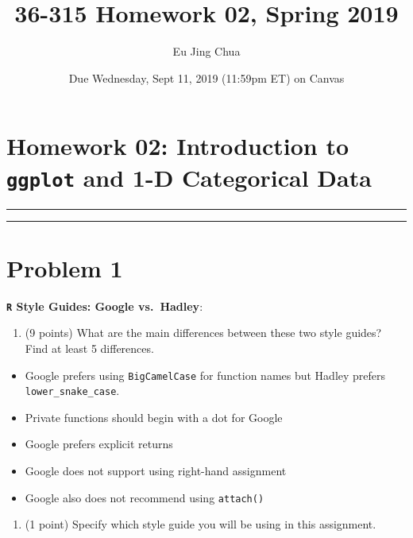 \documentclass[]{article}
\title{36-315 Homework 02, Spring 2019}
\author{Eu Jing Chua}
\date{Due Wednesday, Sept 11, 2019 (11:59pm ET) on Canvas}
\providecommand{\tightlist}{%
  \setlength{\itemsep}{0pt}\setlength{\parskip}{0pt}}
\begin{document}
\maketitle

\hypertarget{homework-02-introduction-to-ggplot-and-1-d-categorical-data}{%
\section{\texorpdfstring{Homework 02: Introduction to \texttt{ggplot}
and 1-D Categorical
Data}{Homework 02: Introduction to ggplot and 1-D Categorical Data}}\label{homework-02-introduction-to-ggplot-and-1-d-categorical-data}}

\begin{center}\rule{0.5\linewidth}{\linethickness}\end{center}

\begin{center}\rule{0.5\linewidth}{\linethickness}\end{center}

\hypertarget{problem-1}{%
\section{Problem 1}\label{problem-1}}

\textbf{\texttt{R} Style Guides: Google vs.~Hadley}:

\begin{enumerate}
\def\labelenumi{\alph{enumi}.}
\tightlist
\item
  (9 points) What are the main differences between these two style
  guides? Find at least 5 differences.
\end{enumerate}

\begin{itemize}
\tightlist
\item
  Google prefers using \texttt{BigCamelCase} for function names but
  Hadley prefers \texttt{lower\_snake\_case}.
\item
  Private functions should begin with a dot for Google
\item
  Google prefers explicit returns
\item
  Google does not support using right-hand assignment
\item
  Google also does not recommend using \texttt{attach()}
\end{itemize}

\begin{enumerate}
\def\labelenumi{\alph{enumi}.}
\setcounter{enumi}{1}
\tightlist
\item
  (1 point) Specify which style guide you will be using in this
  assignment.
\end{enumerate}
\end{document}
